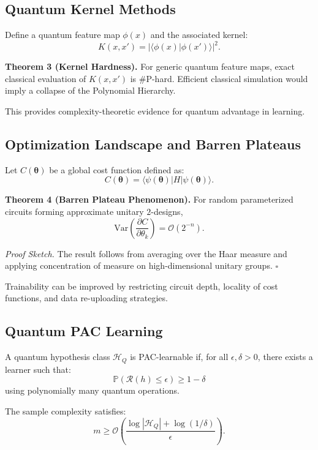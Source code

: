 \documentclass[11pt,a4paper]{article}
\begin{document}
\subsection{Quantum Kernel Methods}

Define a quantum feature map $\phi(x)$ and the associated kernel:
\[
K(x,x') = |\langle \phi(x) | \phi(x') \rangle|^2.
\]

\textbf{Theorem 3 (Kernel Hardness).}
For generic quantum feature maps, exact classical evaluation of $K(x,x')$
is \#P-hard. Efficient classical simulation would imply a collapse of the
Polynomial Hierarchy.

This provides complexity-theoretic evidence for quantum advantage in learning.

\subsection{Optimization Landscape and Barren Plateaus}

Let $C(\boldsymbol{\theta})$ be a global cost function defined as:
\[
C(\boldsymbol{\theta}) =
\langle \psi(\boldsymbol{\theta}) | H | \psi(\boldsymbol{\theta}) \rangle.
\]

\textbf{Theorem 4 (Barren Plateau Phenomenon).}
For random parameterized circuits forming approximate unitary $2$-designs,
\[
\text{Var}\left(\frac{\partial C}{\partial \theta_k}\right)
=
\mathcal{O}\left(2^{-n}\right).
\]

\textit{Proof Sketch.}
The result follows from averaging over the Haar measure and applying
concentration of measure on high-dimensional unitary groups. \hfill $\square$

Trainability can be improved by restricting circuit depth, locality of cost
functions, and data re-uploading strategies.

\subsection{Quantum PAC Learning}

A quantum hypothesis class $\mathcal{H}_Q$ is PAC-learnable if, for all
$\epsilon,\delta > 0$, there exists a learner such that:
\[
\mathbb{P}\left(
\mathcal{R}(h) \leq \epsilon
\right) \geq 1 - \delta
\]
using polynomially many quantum operations.

The sample complexity satisfies:
\[
m \geq
\mathcal{O}\left(
\frac{\log|\mathcal{H}_Q| + \log(1/\delta)}{\epsilon}
\right).
\]
\end{document}
